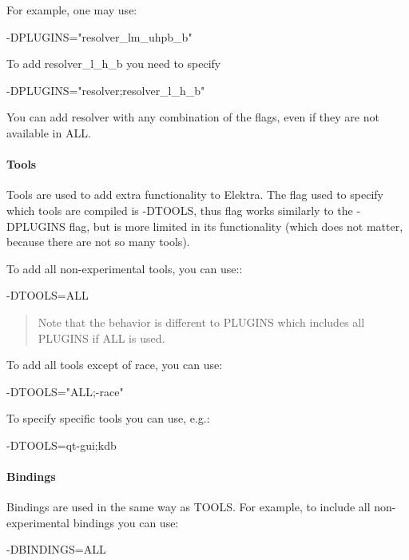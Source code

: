 For example, one may use\+: \begin{DoxyVerb}-DPLUGINS="resolver_lm_uhpb_b"
\end{DoxyVerb}


To add {\ttfamily resolver\+\_\+l\+\_\+h\+\_\+b} you need to specify \begin{DoxyVerb}-DPLUGINS="resolver;resolver_l_h_b"
\end{DoxyVerb}


You can add resolver with any combination of the flags, even if they are not available in {\ttfamily A\+LL}.

\paragraph*{Tools}

Tools are used to add extra functionality to Elektra. The flag used to specify which tools are compiled is {\ttfamily -\/\+D\+T\+O\+O\+LS}, thus flag works similarly to the {\ttfamily -\/\+D\+P\+L\+U\+G\+I\+NS} flag, but is more limited in its functionality (which does not matter, because there are not so many tools).

To add all non-\/experimental tools, you can use\+:\+: \begin{DoxyVerb}-DTOOLS=ALL
\end{DoxyVerb}


\begin{quote}
Note that the behavior is different to P\+L\+U\+G\+I\+NS which includes all P\+L\+U\+G\+I\+NS if A\+LL is used. \end{quote}


To add all tools except of race, you can use\+: \begin{DoxyVerb}-DTOOLS="ALL;-race"
\end{DoxyVerb}


To specify specific tools you can use, e.\+g.\+: \begin{DoxyVerb}-DTOOLS=qt-gui;kdb
\end{DoxyVerb}


\paragraph*{Bindings}

Bindings are used in the same way as {\ttfamily T\+O\+O\+LS}. For example, to include all non-\/experimental bindings you can use\+: \begin{DoxyVerb}-DBINDINGS=ALL
\end{DoxyVerb}


